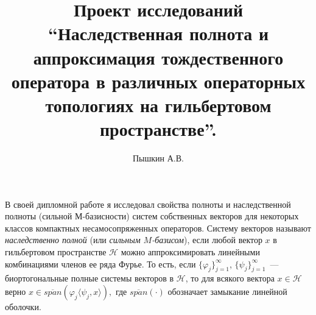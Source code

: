 \documentclass[a4paper,12pt]{article}
\renewcommand{\phi}{\varphi}
\numberwithin{prop_under_lemma}{lemma}
\begin{document}
\title{Проект исследований ``Наследственная полнота и аппроксимация тождественного оператора в 
  различных операторных топологиях на гильбертовом пространстве''.}
\author{Пышкин А.В.}
\date{}
\maketitle

В своей дипломной работе я исследовал свойства полноты и наследственной полноты
(сильной М-базисности) систем собственных векторов для некоторых классов компактных
несамосопряженных операторов. Систему векторов называют {\it наследственно полной} (или {\it сильным $M$-базисом}), если
любой вектор $x$ в гильбертовом пространстве $\mathcal{H}$ можно аппроксимировать
линейными комбинациями членов ее ряда Фурье. То есть, если $\{\phi_j\}_{j=1}^\infty$, $\{\psi_j\}_{j=1}^\infty$~---
биортогональные полные системы векторов в $\mathcal{H}$, то для всякого вектора $x \in \mathcal{H}$ верно
$x \in \overline{span}\left(\phi_j \langle\psi_j, x\rangle\right),$
где $\overline{span}(\cdot)$ обозначает замыкание линейной оболочки.
\end{document}
